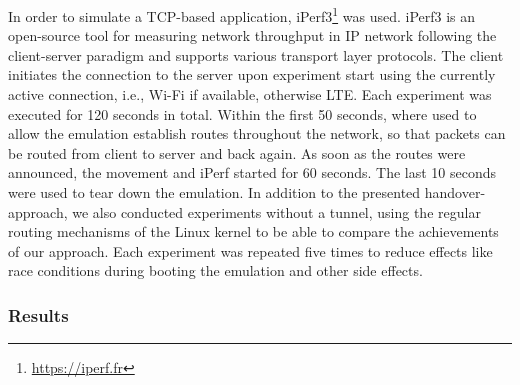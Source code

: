 In order to simulate a TCP-based application, iPerf3\footnote{\url{https://iperf.fr}} was used.
iPerf3 is an open-source tool for measuring network throughput in IP network following the client-server paradigm and supports various transport layer protocols.
The client initiates the connection to the server upon experiment start using the currently active connection, i.e., Wi-Fi if available, otherwise LTE.
Each experiment was executed for 120 seconds in total.
Within the first 50 seconds, where used to allow the emulation establish routes throughout the network, so that packets can be routed from client to server and back again.
As soon as the routes were announced, the movement and iPerf started for 60 seconds.
The last 10 seconds were used to tear down the emulation.
In addition to the presented handover-approach, we also conducted experiments without a tunnel, using the regular routing mechanisms of the Linux kernel to be able to compare the achievements of our approach.
Each experiment was repeated five times to reduce effects like race conditions during booting the emulation and other side effects.

\subsubsection{Results}

